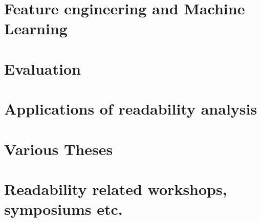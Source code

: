 \documentclass[a4paper,12pt]{report}
\begin{document}
\section{Feature engineering and Machine Learning}

\section{Evaluation}

\section{Applications of readability analysis}

\section{Various Theses}

\section{Readability related workshops, symposiums etc.}



\end{document}
